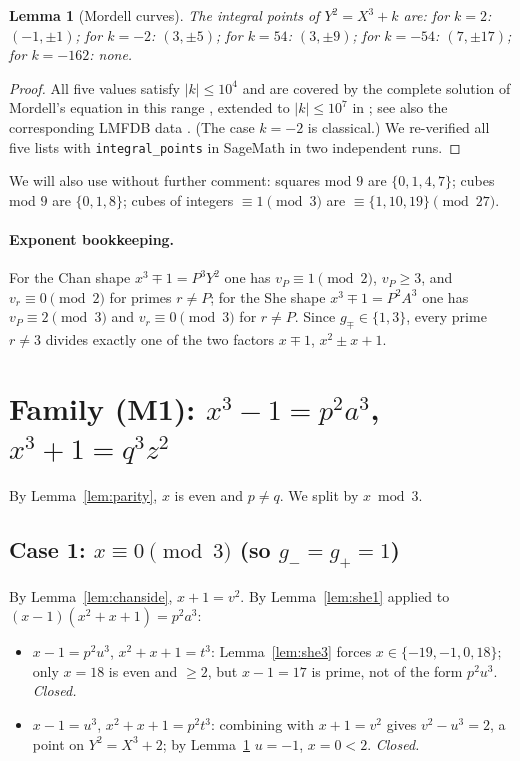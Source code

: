 \documentclass[11pt]{article}
\newtheorem{lemma}[theorem]{Lemma}
\theoremstyle{remark}
\newcommand{\vp}{v}
\begin{document}
\begin{lemma}[Mordell curves]\label{lem:mordell}
The integral points of $Y^2=X^3+k$ are: for $k=2$: $(-1,\pm1)$; for $k=-2$: $(3,\pm5)$; for $k=54$: $(3,\pm9)$; for $k=-54$: $(7,\pm17)$; for $k=-162$: none.
\end{lemma}
\begin{proof}
All five values satisfy $|k|\le 10^4$ and are covered by the complete solution of Mordell's equation in this range \cite{GPZ}, extended to $|k|\le 10^7$ in \cite{BennettGhadermarzi}; see also the corresponding LMFDB data \cite{LMFDB}. (The case $k=-2$ is classical.) We re-verified all five lists with \texttt{integral\_points} in SageMath in two independent runs.
\end{proof}

We will also use without further comment: squares mod $9$ are $\{0,1,4,7\}$; cubes mod $9$ are $\{0,1,8\}$; cubes of integers $\equiv1\pmod3$ are $\equiv\{1,10,19\}\pmod{27}$.

\paragraph{Exponent bookkeeping.} For the Chan shape $x^3\mp1=P^3Y^2$ one has $\vp_P\equiv1\pmod2$, $\vp_P\ge3$, and $\vp_r\equiv0\pmod 2$ for primes $r\neq P$; for the She shape $x^3\mp1=P^2A^3$ one has $\vp_P\equiv2\pmod3$ and $\vp_r\equiv0\pmod3$ for $r\neq P$. Since $g_\mp\in\{1,3\}$, every prime $r\neq3$ divides exactly one of the two factors $x\mp1$, $x^2\pm x+1$.

\section{Family (M1): $x^3-1=p^2a^3$, $x^3+1=q^3z^2$}\label{sec:M1}

By Lemma~\ref{lem:parity}, $x$ is even and $p\neq q$. We split by $x\bmod 3$.

\subsection*{Case 1: $x\equiv0\pmod3$ (so $g_-=g_+=1$)}
By Lemma~\ref{lem:chanside}, $x+1=v^2$. By Lemma~\ref{lem:she1} applied to $(x-1)(x^2+x+1)=p^2a^3$:
\begin{itemize}
\item[(ii)] $x-1=p^2u^3$, $x^2+x+1=t^3$: Lemma~\ref{lem:she3} forces $x\in\{-19,-1,0,18\}$; only $x=18$ is even and $\ge2$, but $x-1=17$ is prime, not of the form $p^2u^3$. \emph{Closed.}
\item[(i)] $x-1=u^3$, $x^2+x+1=p^2t^3$: combining with $x+1=v^2$ gives $v^2-u^3=2$, a point on $Y^2=X^3+2$; by Lemma~\ref{lem:mordell} $u=-1$, $x=0<2$. \emph{Closed.}
\end{itemize}
\end{document}
